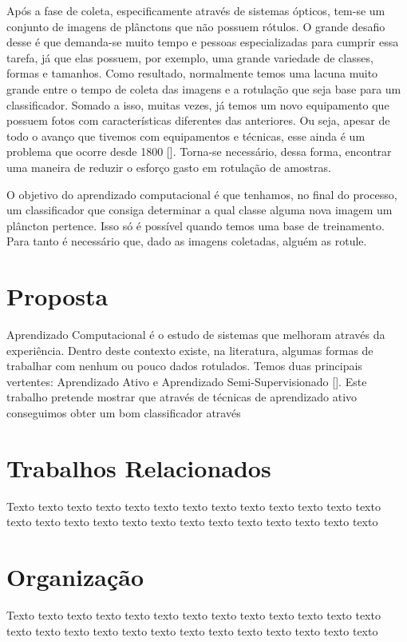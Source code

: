 Após a fase de coleta, especificamente através de sistemas ópticos, tem-se um conjunto de imagens de plânctons que não possuem rótulos. O grande desafio desse é que demanda-se muito tempo e pessoas especializadas para cumprir essa tarefa, já que elas possuem, por exemplo, uma grande variedade de classes, formas e tamanhos. Como resultado, normalmente temos uma lacuna muito grande entre o tempo de coleta das imagens e a rotulação que seja base para um classificador. Somado a isso, muitas vezes, já temos um novo equipamento que possuem fotos com características diferentes das anteriores. Ou seja, apesar de todo o avanço que tivemos com equipamentos e técnicas, esse ainda é um problema que ocorre desde 1800 [\cite{benfield2007rapid}]. Torna-se necessário, dessa forma, encontrar uma maneira de reduzir o esforço gasto em rotulação de amostras.  
    
O objetivo do aprendizado computacional é que tenhamos, no final do processo, um classificador que consiga determinar a qual classe alguma nova imagem um plâncton pertence. Isso só é possível quando temos uma base de treinamento. Para tanto é necessário que, dado as imagens coletadas, alguém as rotule. 


\section{Proposta}
\label{sec:intro_proposta}

Aprendizado Computacional é o estudo de sistemas que melhoram através da experiência. Dentro deste contexto existe, na literatura, algumas formas de trabalhar com nenhum ou pouco dados rotulados. Temos duas principais vertentes: Aprendizado Ativo e Aprendizado Semi-Supervisionado [\cite{zhu2006semi, abu2012learning}].  Este trabalho pretende mostrar que através de técnicas de aprendizado ativo conseguimos obter um bom classificador através 


\section{Trabalhos Relacionados}
\label{sec:intro_relacionados}

Texto texto texto texto texto texto texto texto texto texto texto texto texto texto texto texto texto texto texto texto texto texto texto texto texto texto


\section{Organização}
\label{sec:intro_organizacao}

Texto texto texto texto texto texto texto texto texto texto texto texto texto texto texto texto texto texto texto texto texto texto texto texto texto texto